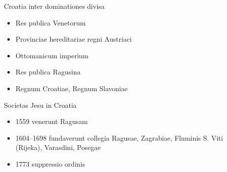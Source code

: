 \documentclass[14pt]{beamer}
\begin{document}
{
    \begin{frame}[plain]
    \end{frame}
    }


\begin{frame}{Croatia inter dominationes divisa}

  \begin{itemize}
  \item Res publica Venetorum
  \item Provinciae hereditariae regni Austriaci
  \item   Ottomanicum imperium
  \item   Res publica Ragusina
  \item   Regnum Croatiae, Regnum Slavoniae
  \end{itemize}
\end{frame}


\begin{frame}{Societas Jesu in Croatia}
\begin{itemize}
  \item \alert{1559} venerunt Ragusam
  \item \alert{1604–1698} fundaverunt collegia Ragusae, Zagrabiae, Fluminis S. Viti (Rijeka), Varasdini, Posegae
  \item \alert{1773} suppressio ordinis
\end{itemize}
\end{frame}
\end{document}
